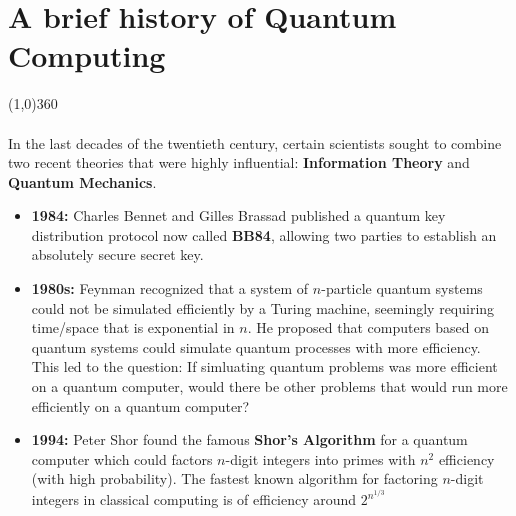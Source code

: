 \chapter{A brief history of Quantum Computing}
\line(1,0){360} \\ \\
In the last decades of the twentieth century, certain scientists sought to combine two recent theories that were highly influential: \textbf{Information Theory} and \textbf{Quantum Mechanics}.

\begin{itemize}
\item \textbf{1984:} Charles Bennet and Gilles Brassad published a quantum key distribution protocol now called \textbf{BB84}, allowing two parties to establish an absolutely secure secret key.
\item \textbf{1980s:} Feynman recognized that a system of
    $n$-particle quantum systems could not be simulated efficiently by a Turing machine, seemingly requiring time/space that is exponential in $n$. He proposed that computers based on quantum systems could simulate quantum processes with more efficiency. This led to the question: If simluating quantum problems was more efficient on a quantum computer, would there be other problems that would run more efficiently on a quantum computer?
\item \textbf{1994:} Peter Shor found the famous \textbf{Shor's Algorithm} for a quantum computer which could factors $n$-digit integers into primes with $n^2$ efficiency (with high probability). The fastest known algorithm for factoring $n$-digit integers in classical computing is of efficiency around $2^{n^{1/3}}$
\end{itemize}

